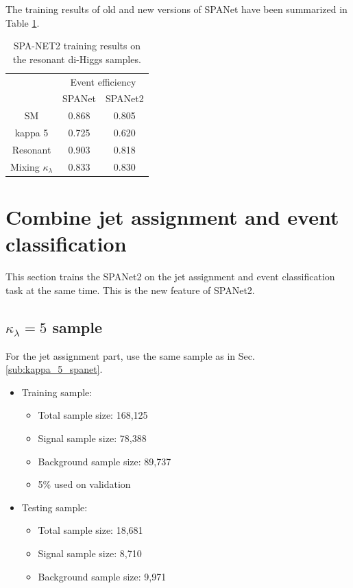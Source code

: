 \documentclass[12pt]{article}
\begin{document}
		The training results of old and new versions of SPANet have been summarized in Table \ref{tab:training_results_of_SPANET_12}.
		\begin{table}[htpb]
			\centering
			\caption{SPA-NET2 training results on the resonant di-Higgs samples.}
			\label{tab:training_results_of_SPANET_12}
			\begin{tabular}{c|cc}
						 & \multicolumn{2}{c}{Event efficiency} \\
						 & SPANet           & SPANet2           \\ \hline
			SM           & 0.868            & 0.805             \\
			kappa 5      & 0.725            & 0.620             \\
			Resonant     & 0.903            & 0.818             \\
			Mixing $\kappa_\lambda$& 0.833            & 0.830            
			\end{tabular}
		\end{table}


\section{Combine jet assignment and event classification}%
\label{sec:combine_jet_assignment_and_event_classification}
	This section trains the SPANet2 on the jet assignment and event classification task at the same time. This is the new feature of SPANet2.
	\subsection{\texorpdfstring{$\kappa_\lambda=5$}{kappa 5} sample}%
	\label{sub:kappa_5_sample}
		For the jet assignment part, use the same sample as in Sec. \ref{sub:kappa_5_spanet}. 
		\begin{itemize}
			\item Training sample:
			\begin{itemize}
				\item Total sample size: 168,125
				\item Signal sample size: 78,388
				\item Background sample size: 89,737
				\item 5\% used on validation
			\end{itemize}
			\item Testing sample:
			\begin{itemize}
				\item Total sample size: 18,681
				\item Signal sample size: 8,710
				\item Background sample size: 9,971
			\end{itemize}
		\end{itemize}
\end{document}

